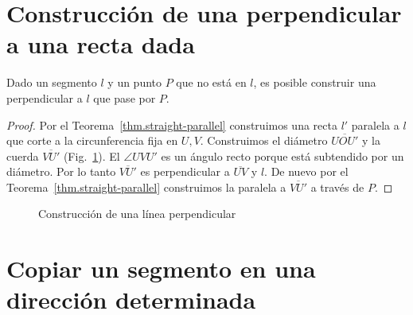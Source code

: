 \section{Construcción de una perpendicular a una recta dada}\label{s.perp}

\begin{theorem}\label{thm.straight-perp}
Dado un segmento $l$ y un punto $P$ que no está en $l$, es posible construir una perpendicular a $l$ que pase por $P$.
\end{theorem}

\begin{proof}
Por el Teorema~\ref{thm.straight-parallel} construimos una recta $l'$ paralela a $l$ que corte a la circunferencia fija en $U,V$. Construimos el diámetro $\overline{UOU'}$ y la cuerda $\overline{VU'}$ (Fig.~\ref{f.se-perp}). El $\angle UVU'$ es un ángulo recto porque está subtendido por un diámetro. Por lo tanto $\overline{VU'}$ es perpendicular a $\overline{UV}$ y $l$. De nuevo por el Teorema~\ref{thm.straight-parallel} construimos la paralela a $\overline{VU'}$ a través de $P$.
\end{proof}

\begin{figure}%
\begin{center}
\end{center}
\caption{Construcción de una línea perpendicular}\label{f.se-perp}
\end{figure}

\section{Copiar un segmento en una dirección determinada}\label{s.copy}

